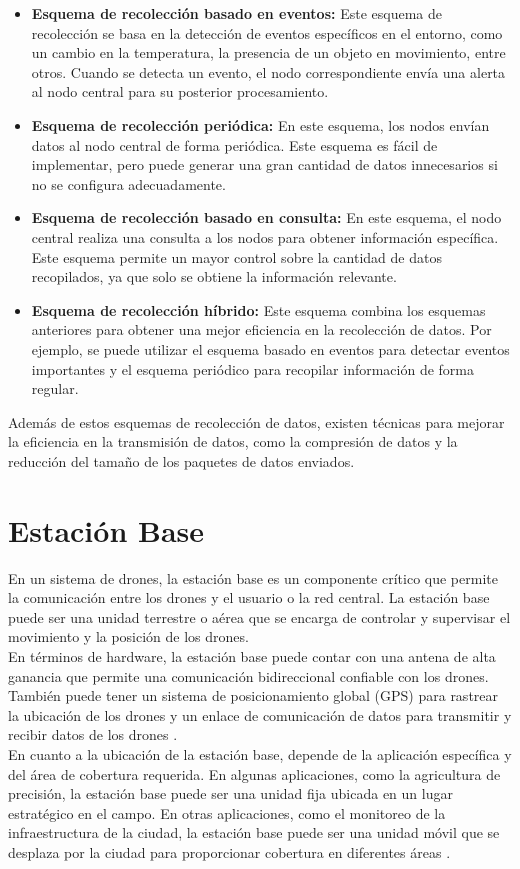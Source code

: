 \begin{itemize}
    \item \textbf{Esquema de recolección basado en eventos:} Este esquema de recolección se basa en la detección de eventos específicos en el entorno, como un cambio en la temperatura, la presencia de un objeto en movimiento, entre otros. Cuando se detecta un evento, el nodo correspondiente envía una alerta al nodo central para su posterior procesamiento.
    \item \textbf{Esquema de recolección periódica:} En este esquema, los nodos envían datos al nodo central de forma periódica. Este esquema es fácil de implementar, pero puede generar una gran cantidad de datos innecesarios si no se configura adecuadamente.
    \item \textbf{Esquema de recolección basado en consulta:} En este esquema, el nodo central realiza una consulta a los nodos para obtener información específica. Este esquema permite un mayor control sobre la cantidad de datos recopilados, ya que solo se obtiene la información relevante.
    \item \textbf{Esquema de recolección híbrido:} Este esquema combina los esquemas anteriores para obtener una mejor eficiencia en la recolección de datos. Por ejemplo, se puede utilizar el esquema basado en eventos para detectar eventos importantes y el esquema periódico para recopilar información de forma regular.
\end{itemize}

\noindent Además de estos esquemas de recolección de datos, existen técnicas para mejorar la eficiencia en la transmisión de datos, como la compresión de datos y la reducción del tamaño de los paquetes de datos enviados.

\section{Estación Base}

En un sistema de drones, la estación base es un componente crítico que permite la comunicación entre los drones y el usuario o la red central. La estación base puede ser una unidad terrestre o aérea que se encarga de controlar y supervisar el movimiento y la posición de los drones.\\
En términos de hardware, la estación base puede contar con una antena de alta ganancia que permite una comunicación bidireccional confiable con los drones. También puede tener un sistema de posicionamiento global (GPS) para rastrear la ubicación de los drones y un enlace de comunicación de datos para transmitir y recibir datos de los drones \cite{67}.\\
En cuanto a la ubicación de la estación base, depende de la aplicación específica y del área de cobertura requerida. En algunas aplicaciones, como la agricultura de precisión, la estación base puede ser una unidad fija ubicada en un lugar estratégico en el campo. En otras aplicaciones, como el monitoreo de la infraestructura de la ciudad, la estación base puede ser una unidad móvil que se desplaza por la ciudad para proporcionar cobertura en diferentes áreas \cite{68}.

